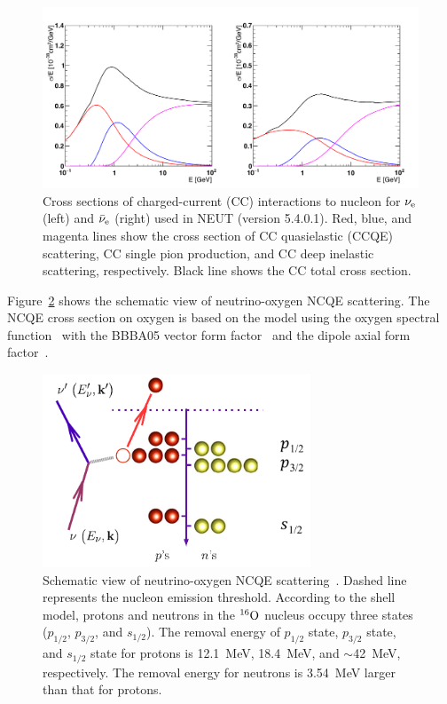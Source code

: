 \begin{figure}[tbp]
	\centering
	\includegraphics[width=16cm]{Figures/Simulation/CC_XS_nue}
	\caption[Cross sections of charged-current interactions to nucleon for $\nu_{\rm e}$ and $\bar{\nu}_{\rm e}$ used in NEUT (version 5.4.0.1)]{
	Cross sections of charged-current (CC) interactions to nucleon for $\nu_{\rm e}$ (left) and $\bar{\nu}_{\rm e}$ (right) used in NEUT (version 5.4.0.1).
	Red, blue, and magenta lines show the cross section of CC quasielastic (CCQE) scattering, CC single pion production, and CC deep inelastic scattering, respectively.
	Black line shows the CC total cross section.
	}\label{CC_XS_nue}
\end{figure}

\hs
Figure~\ref{NCQE} shows the schematic view of neutrino-oxygen NCQE scattering.
The NCQE cross section on oxygen is based on the model using the oxygen spectral function~\cite{2005Benhar,2012Ankowski} with the BBBA05 vector form factor~\cite{2006Bradford} and the dipole axial form factor~\cite{2006Bradford}.

\begin{figure}[tbp]
	\centering
	\includegraphics[width=8cm]{Figures/Simulation/NCQE}
	\caption[Schematic view of neutrino-oxygen NCQE scattering]{
	Schematic view of neutrino-oxygen NCQE scattering~\cite{2012Ankowski}.
	Dashed line represents the nucleon emission threshold.
	According to the shell model, protons and neutrons in the $^{16}{\rm O}$ nucleus occupy three states ($p_{1/2}$, $p_{3/2}$, and $s_{1/2}$).
	The removal energy of $p_{1/2}$ state, $p_{3/2}$ state, and $s_{1/2}$ state for protons is 12.1~MeV, 18.4~MeV, and $\sim$42~MeV, respectively.
	The removal energy for neutrons is 3.54~MeV larger than that for protons.
	}\label{NCQE}
\end{figure}

